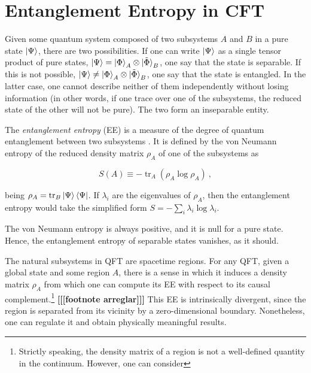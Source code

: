 \documentclass[twocolumn]{revtex4}
\providecommand{\eq}[2]{
    \begin{equation}
        #2
    \label{eq:#1}
    \end{equation}
}
\DeclareMathOperator{\tr}{tr}
\begin{document}
\section{Entanglement Entropy in CFT} \label{s:EE_CFT}

Given some quantum system composed of two subsystems $A$ and $B$ in a pure state $\ket{\Psi}$, there are two possibilities. If one can write $\ket{\Psi}$ as a single tensor product of pure states, $\ket{\Psi} = \ket{\Phi}_A \otimes \ket{\tilde{\Phi}}_B$, one say that the state is separable. If this is not possible, $\ket{\Psi} \neq \ket{\Phi}_A \otimes \ket{\tilde{\Phi}}_B$, one say that the state is entangled.
In the latter case, one cannot describe neither of them independently without losing information (in other words, if one trace over one of the subsystems, the reduced state of the other will not be pure). The two form an inseparable entity.

The \emph{entanglement entropy} (EE) is a measure of the degree of quantum entanglement between two subsystems \cite{nishioka_entanglement_2018}. It is defined by the von Neumann entropy of the reduced density matrix $\rho_A$ of one of the subsystems as
\eq{EE}{
    S(A) \equiv - \tr_A ( \rho_A \log \rho_A ) \ ,
}
being $\rho_A = \tr_B \ket{\Psi}\bra{\Psi}$. If $\lambda_i$ are the eigenvalues of $\rho_A$, then the entanglement entropy would take the simplified form $S = - \sum_i \lambda_i \log \lambda_i$.

The von Neumann entropy is always positive, and it is null for a pure state. Hence, the entanglement entropy of separable states vanishes, as it should. 


The natural subsystems in QFT are spacetime regions. For any QFT, given a global state and some region $A$, there is a sense in which it induces a density matrix $\rho_A$ from which one can compute its EE with respect to its causal complement.\footnote{Strictly speaking, the density matrix of a region is not a well-defined quantity in the continuum. However, one can consider } {\bf [[[footnote arreglar]]]}
This EE is intrinsically divergent, since the region is separated from its vicinity by a zero-dimensional boundary. Nonetheless, one can regulate it and obtain physically meaningful results.
\end{document}
